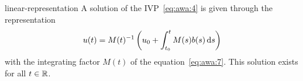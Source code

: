\begin{Lemma}{linear-representation}
  A solution of the IVP~\eqref{eq:awa:4} is given through the 
  representation
  \begin{gather}
    \label{eq:awa:8}
    u(t) =  M(t)^{-1}\left(u_0 + \int_{t_0}^t M(s) b(s) \,\mathrm{d} s\right)
  \end{gather}
  with the integrating factor $M(t)$ of the equation~\eqref{eq:awa:7}.
  This solution exists for all $t\in \mathbb R$.
\end{Lemma}


